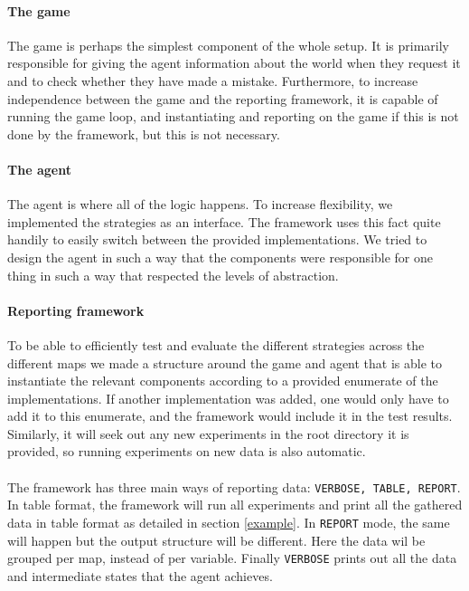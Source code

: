 \documentclass[british]{article}
\newcommand{\code}[1]{\texttt{#1}}
\begin{document}
\paragraph{The game} The game is perhaps the simplest component of the whole setup. It is primarily responsible for giving the agent information about the world when they request it and to check whether they have made a mistake. Furthermore, to increase independence between the game and the reporting framework, it is capable of running the game loop, and instantiating and reporting on the game if this is not done by the framework, but this is not necessary. 

\paragraph{The agent} The agent is where all of the logic happens. To increase flexibility, we implemented the strategies as an interface. The framework uses this fact quite handily to easily switch between the provided implementations. We tried to design the agent in such a way that the components were responsible for one thing in such a way that respected the levels of abstraction. 

\paragraph{Reporting framework} To be able to efficiently test and evaluate the different strategies across the different maps we made a structure around the game and agent that is able to instantiate the relevant components according to a provided enumerate of the implementations. If another implementation was added, one would only have to add it to this enumerate, and the framework would include it in the test results. Similarly, it will seek out any new experiments in the root directory it is provided, so running experiments on new data is also automatic. 

\paragraph{} The framework has three main ways of reporting data: \code{VERBOSE, TABLE, REPORT}. In table format, the framework will run all experiments and print all the gathered data in table format as detailed in section \ref{example}. In \code{REPORT} mode, the same will happen but the output structure will be different. Here the data wil be grouped per map, instead of per variable. Finally \code{VERBOSE} prints out all the data and intermediate states that the agent achieves. 
\end{document}
